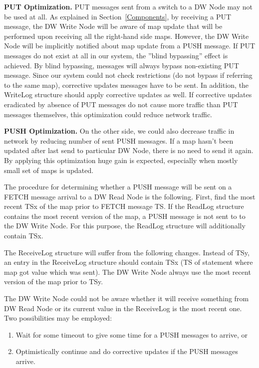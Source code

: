 \documentclass{sig-semester}
\begin{document}
\textbf{PUT Optimization.} PUT messages sent from a switch to a DW Node may not be used at all. As explained in Section~\ref{Components}, by receiving a PUT message, the DW Write Node will be aware of map update that will be performed upon receiving all the right-hand side maps. However, the DW Write Node will be implicitly notified about map update from a PUSH message. If PUT messages do not exist at all in our system, the ''blind bypassing'' effect is achieved. By blind bypassing, messages will always bypass non-existing PUT message. Since our system could not check restrictions (do not bypass if referring to the same map), corrective updates messages have to be sent. In addition, the WriteLog structure should apply corrective updates as well. If corrective updates eradicated by absence of PUT messages do not cause more traffic than PUT messages themselves, this optimization could reduce network traffic.

\textbf{PUSH Optimization.} On the other side, we could also decrease traffic in network by reducing number of sent PUSH messages. If a map hasn't been updated after last send to particular DW Node, there is no need to send it again. By applying this optimization huge gain is expected, especially when mostly small set of maps is updated. 

The procedure for determining whether a PUSH message will be sent on a FETCH message arrival to a DW Read Node is the following. First, find the most recent TSx of the map prior to FETCH message TS. If the ReadLog structure contains the most recent version of the map, a PUSH message is not sent to to the DW Write Node. For this purpose, the ReadLog structure will additionally contain TSx.

The ReceiveLog structure will suffer from the following changes. Instead of TSy, an entry in the ReceiveLog structure should contain TSx (TS of statement where map got value which was sent). The DW Write Node always use the most recent version of the map prior to TSy.

The DW Write Node could not be aware whether it will receive something from DW Read Node or its current value in the ReceiveLog is the most recent one. Two possibilities may be employed:
\begin{enumerate}[(1)]
 \item Wait for some timeout to give some time for a PUSH messages to arrive, or
 \item Optimistically continue and do corrective updates if the PUSH messages arrive. 
\end{enumerate}
\end{document}
